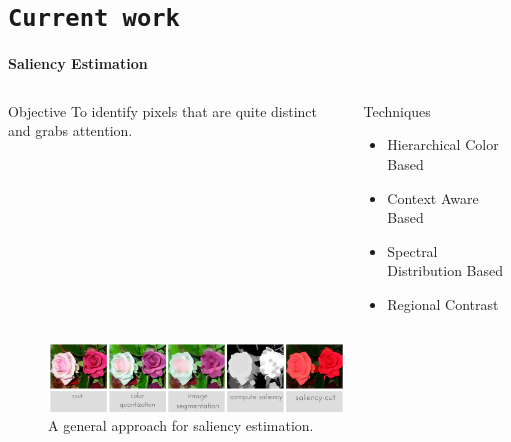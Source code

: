 \section{\texttt{Current work}}
\begin{frame}{\textbf{Saliency Estimation}}
\begin{columns}
	\begin{column}{0.48\textwidth}
		\begin{varblock}[\textwidth]{Objective}
			To identify pixels that are quite distinct and grabs attention.
		\end{varblock}
	\end{column}
	\begin{column}{0.48\textwidth}
	\begin{varblock}[\textwidth]{Techniques}
		\footnotesize
		\begin{multicols}{2}
		\begin{itemize}
    			\item Hierarchical Color Based
		    \item Context Aware Based
    			\item Spectral Distribution Based
    			\item Regional Contrast
		\end{itemize}
		\end{multicols}			
	\end{varblock}
	\end{column}
\end{columns}
	\begin{figure}
		\centering
		\includegraphics[width=0.7\textwidth]{./img/saliency.eps}
		\caption{A general approach for saliency estimation.}
	\end{figure}
\end{frame}